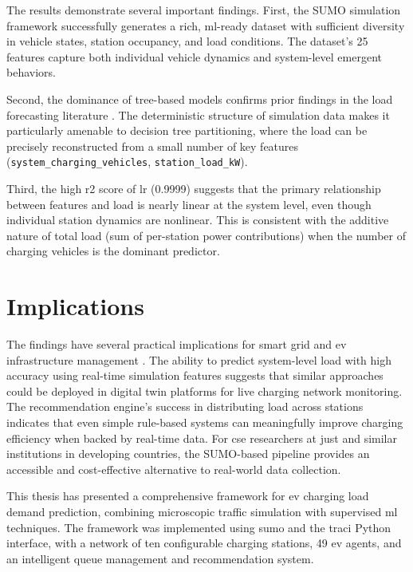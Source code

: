 \documentclass{thesis-library}
\begin{document}
The results demonstrate several important findings. First, the SUMO simulation framework
successfully generates a rich, \Gls{ml}-ready dataset with sufficient diversity in
vehicle states, station occupancy, and load conditions. The dataset's 25 features capture
both individual vehicle dynamics and system-level emergent behaviors.

Second, the dominance of tree-based models confirms prior findings in the load forecasting
literature \cite{ml_ev_load2021, rf_load_forecast2020}. The deterministic structure of
simulation data makes it particularly amenable to decision tree partitioning, where the
load can be precisely reconstructed from a small number of key features
(\texttt{system\_charging\_vehicles}, \texttt{station\_load\_kW}).

Third, the high \Gls{r2} score of \Gls{lr} (0.9999) suggests that the primary
relationship between features and load is nearly linear at the system level, even though
individual station dynamics are nonlinear. This is consistent with the additive nature of
total load (sum of per-station power contributions) when the number of charging vehicles
is the dominant predictor.

\section{Implications}

The findings have several practical implications for smart grid and \Gls{ev}
infrastructure management \cite{smart_charging2022, demand_response2023}. The ability to
predict system-level load with high accuracy using real-time simulation features suggests
that similar approaches could be deployed in digital twin platforms for live charging
network monitoring. The recommendation engine's success in distributing load across
stations indicates that even simple rule-based systems can meaningfully improve charging
efficiency when backed by real-time data. For \Gls{cse} researchers at \Gls{just} and
similar institutions in developing countries, the SUMO-based pipeline provides an
accessible and cost-effective alternative to real-world data collection.


This thesis has presented a comprehensive framework for \Gls{ev} charging load demand
prediction, combining microscopic traffic simulation with supervised \Gls{ml} techniques.
The framework was implemented using \Gls{sumo} and the \Gls{traci} Python interface, with
a network of ten configurable charging stations, 49 \Gls{ev} agents, and an intelligent
queue management and recommendation system.
\end{document}

